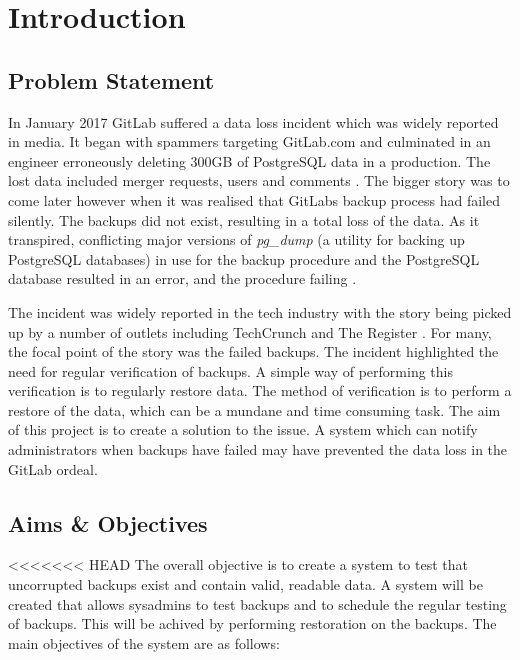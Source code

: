 \section{Introduction}

\subsection{Problem Statement}
In January 2017 GitLab suffered a data loss incident which was widely reported in media. It began with spammers targeting GitLab.com and culminated in an engineer erroneously deleting 300GB of PostgreSQL data in a production. The lost data included merger requests, users and comments \citep{gitlab1}. The bigger story was to come later however when it was realised that GitLabs backup process had failed silently. The backups did not exist, resulting in a total loss of the data. As it transpired, conflicting major versions of \textit{pg\_dump} (a utility for backing up PostgreSQL databases) in use for the backup procedure and the PostgreSQL database resulted in an error, and the procedure failing \citep{gitlab2}.

The incident was widely reported in the tech industry with the story being picked up by a number of outlets including TechCrunch \citeyearpar{lomas} and The Register \citeyearpar{sharwood}. For many, the focal point of the story was the failed backups. The incident highlighted the need for regular verification of backups. A simple way of performing this verification is to regularly restore data. The method of verification is to perform a restore of the data, which can be a mundane and time consuming task. The aim of this project is to create a solution to the issue. A system which can notify administrators when backups have failed may have prevented the data loss in the GitLab ordeal.

\subsection{Aims \& Objectives}
<<<<<<< HEAD
The overall objective is to create a system to test that uncorrupted backups exist and contain valid, readable data. A system will be created that allows sysadmins to test backups and to schedule the regular testing of backups. This will be achived by performing restoration on the backups. The main objectives of the system are as follows:

